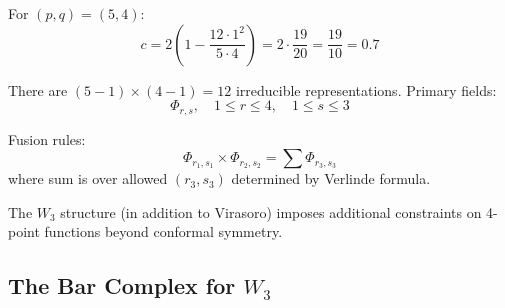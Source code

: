\begin{example}
For $(p,q) = (5,4)$:
$$c = 2\left(1 - \frac{12 \cdot 1^2}{5 \cdot 4}\right) = 2 \cdot \frac{19}{20} = \frac{19}{10} = 0.7$$

There are $(5-1) \times (4-1) = 12$ irreducible representations. Primary fields:
$$\Phi_{r,s}, \quad 1 \le r \le 4, \quad 1 \le s \le 3$$

Fusion rules:
$$\Phi_{r_1,s_1} \times \Phi_{r_2,s_2} = \sum \Phi_{r_3,s_3}$$
where sum is over allowed $(r_3,s_3)$ determined by Verlinde formula.

The $W_3$ structure (in addition to Virasoro) imposes additional constraints on 4-point functions beyond conformal symmetry.
\end{example}

\subsection{The Bar Complex for $W_3$}


